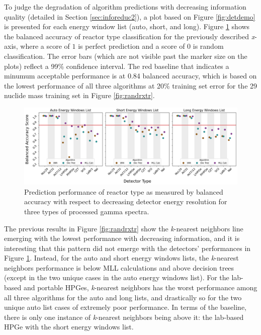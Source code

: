 
To judge the degradation of algorithm predictions with decreasing information
quality (detailed in Section \ref{sec:inforeduc2}), a plot based on Figure
\ref{fig:detdemo} is presented for each energy window list (auto, short, and
long).  Figure \ref{fig:rxtr} shows the balanced accuracy of reactor type
classification for the previously described \textit{x}-axis, where a score of
$1$ is perfect prediction and a score of $0$ is random classification. The
error bars (which are not visible past the marker size on the plots) reflect a
99\% confidence interval.  The red baseline that indicates a minumum acceptable
performance is at 0.84 balanced accuracy, which is based on the lowest
performance of all three algorithms at 20\% training set error for the 29
nuclide mass training set in Figure \ref{fig:randrxtr}.  

\begin{figure}[!htb]
  \centering
  \includegraphics[width=\textwidth]{./chapters/exp2/detector_preds_wrt_enlist_BalAcc_rxtr.png}
  \caption{Prediction performance of reactor type as measured by balanced 
           accuracy with respect to decreasing detector energy resolution 
           for three types of processed gamma spectra.}
  \label{fig:rxtr}
\end{figure}

The previous results in Figure \ref{fig:randrxtr} show the \textit{k}-nearest
neighbors line emerging with the lowest performance with decreasing
information, and it is interesting that this pattern did not emerge with the
detectors' performances in Figure \ref{fig:rxtr}.  Instead, for the auto and
short energy windows lists, the \textit{k}-nearest neighbors performance is
below \gls{MLL} calculations and above decision trees (except in the two unique
cases in the auto energy windows list).  For the lab-based and portable
\gls{HPGe}s, \textit{k}-nearest neighbors has the worst performance among all
three algorithms for the auto and long lists, and drastically so for the two
unique auto list cases of extremely poor performance.  In terms of the
baseline, there is only one instance of \textit{k}-nearest neighbors being
above it: the lab-based \gls{HPGe} with the short energy windows list. 

